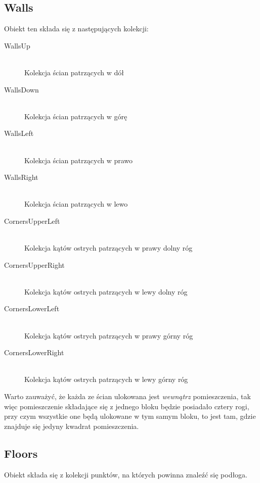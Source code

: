 \documentclass{article}
\begin{document}
\subsection{Walls}
Obiekt ten składa się z następujących kolekcji:
\begin{description}
  \item[WallsUp] \hfill \\
    Kolekcja ścian patrzących w dół
  \item[WallsDown] \hfill \\
    Kolekcja ścian patrzących w górę
  \item[WallsLeft] \hfill \\
    Kolekcja ścian patrzących w prawo
  \item[WallsRight] \hfill \\
    Kolekcja ścian patrzących w lewo
  \item[CornersUpperLeft] \hfill \\
    Kolekcja kątów ostrych patrzących w prawy dolny róg
  \item[CornersUpperRight] \hfill \\
    Kolekcja kątów ostrych patrzących w lewy dolny róg
  \item[CornersLowerLeft] \hfill \\
    Kolekcja kątów ostrych patrzących w prawy górny róg
  \item[CornersLowerRight] \hfill \\
    Kolekcja kątów ostrych patrzących w lewy górny róg
\end{description}
Warto zauważyć, że każda ze ścian ulokowana jest \textit{wewnątrz} pomieszczenia, tak więc pomieszczenie składające się z jednego bloku będzie posiadało cztery rogi, przy czym wszystkie one będą ulokowane w tym samym bloku, to jest tam, gdzie znajduje się jedyny kwadrat pomieszczenia.
\subsection{Floors}
Obiekt składa się z kolekcji punktów, na których powinna znaleźć się podłoga.
%
\end{document}
